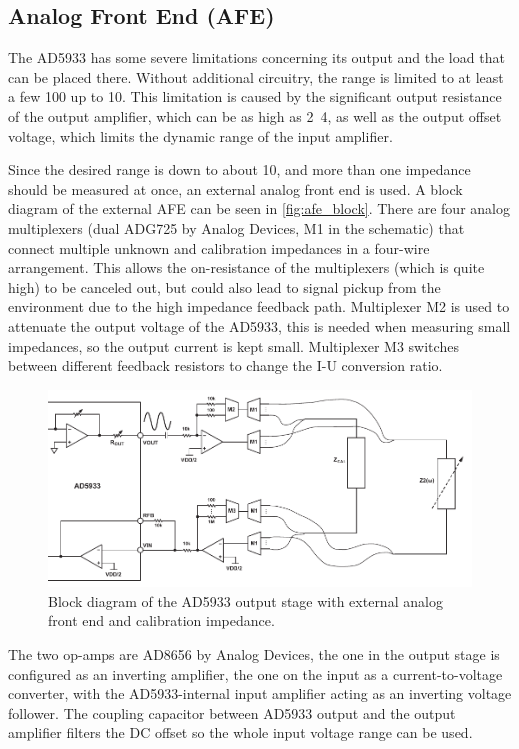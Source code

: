 \subsection{Analog Front End (AFE)}

The AD5933 has some severe limitations concerning its output and the load that can be placed there. Without additional
circuitry, the range is limited to at least a few \unit{100}{\kilo\ohm} up to \unit{10}{\mega\ohm}.
This limitation is caused by the significant output resistance of the output amplifier, which can be as high as
\unit{2.4}{\kilo\ohm}, as well as the output offset voltage, which limits the dynamic range of the input amplifier.

Since the desired range is down to about \unit{10}{\ohm}, and more than one impedance should be measured at once,
an external analog front end is used.
A block diagram of the external AFE can be seen in \autoref{fig:afe_block}.
There are four analog multiplexers (dual ADG725 by Analog Devices, M1 in the schematic) that connect multiple unknown
and calibration impedances in a four-wire arrangement. This allows the on-resistance of the multiplexers (which is
quite high) to be canceled out, but could also lead to signal pickup from the environment due to the high impedance
feedback path.
Multiplexer M2 is used to attenuate the output voltage of the AD5933, this is needed when measuring small impedances,
so the output current is kept small.
Multiplexer M3 switches between different feedback resistors to change the I-U conversion ratio.

\begin{figure}[hpb]
  \centering
    \includegraphics[width=\textwidth]{bilder/afe_block.pdf}
  \caption{Block diagram of the AD5933 output stage with external analog front end and calibration impedance.}
  \label{fig:afe_block}
\end{figure}

The two op-amps are AD8656 by Analog Devices, the one in the output stage is configured as an inverting amplifier,
the one on the input as a current-to-voltage converter, with the AD5933-internal input amplifier acting as an inverting
voltage follower. The coupling capacitor between AD5933 output and the output amplifier filters the DC offset so the
whole input voltage range can be used.

